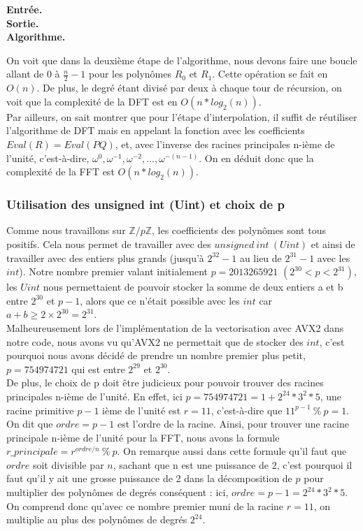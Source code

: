 \documentclass[12pt, a4paper]{article}
\begin{document}
\begin{tcolorbox}[colback=cyan!5!white,
                  colframe=cyan!100!black,
                  title=\textbf{Algorithme DFT (METTRE SOURCES)}
                 ]
\textbf{Entrée.} \\
\textbf{Sortie.} \\
\textbf{Algorithme.}
\end{tcolorbox}

On voit que dans la deuxième étape de l'algorithme, nous devons faire une boucle allant de 0 à $\frac{n}{2}-1$ pour les polynômes $R_0$ et $R_1$. Cette opération se fait en $O(n)$. De plus, le degré étant divisé par deux à chaque tour de récursion, on voit que la complexité de la DFT est en $O(n*log_2(n))$. \\
Par ailleurs, on sait montrer que pour l'étape d'interpolation, il suffit de réutiliser l'algorithme de DFT mais en appelant la fonction avec les coefficients $Eval(R)=Eval(PQ)$, et, avec l'inverse des racines principales n-ième de l'unité, c'est-à-dire, $\omega^{0},\omega^{-1},\omega^{-2},\dots,\omega^{-(n-1)}$.
On en déduit donc que la complexité de la FFT est $O(n*log_2(n))$.

\subsubsection{Utilisation des unsigned int (Uint) et choix de p}

Comme nous travaillons sur $\mathbb{Z}/p\mathbb{Z}$, les coefficients des polynômes sont tous positifs. Cela nous permet de travailler avec des $unsigned\ int\ (Uint)$ et ainsi de travailler avec des entiers plus grands (jusqu’à $2^{32}-1$ au lieu de $2^{31}-1$ avec les $int$). Notre nombre premier valant initialement $p=2013265921$ $(2^{30} < p < 2^{31})$, les $Uint$ nous permettaient de pouvoir stocker la somme de deux entiers a et b entre $2^{30}$ et $p-1$, alors que ce n'était possible avec les $int$ car $a+b\geq2\times2^{30}=2^{31}$. \\
Malheureusement lors de l'implémentation de la vectorisation avec AVX2 dans notre code, nous avons vu qu'AVX2 ne permettait que de stocker des $int$, c'est pourquoi nous avons décidé de prendre un nombre premier plus petit, $p=754974721$ qui est entre $2^{29}$ et  $2^{30}$. \\
De plus, le choix de p doit être judicieux pour pouvoir trouver des racines principales n-ième de l'unité. En effet, ici $p = 754974721 = 1+2^{24}*3^2*5$, une racine primitive $p-1$ ième de l'unité est $r = 11$, c'est-à-dire que $11^{p-1}\ \%\ p = 1$. On dit que $ordre = p-1$ est l'ordre de la racine. Ainsi, pour trouver une racine principale n-ième de l'unité pour la FFT, nous avons la formule $r\_principale = r^{ordre/n}\ \% \ p$. On remarque aussi dans cette formule qu'il faut que $ordre$ soit divisible par $n$, sachant que n est une puissance de 2, c'est pourquoi il faut qu'il y ait une grosse puissance de 2 dans la décomposition de $p$ pour multiplier des polynômes de degrés conséquent : ici, $ordre = p-1 = 2^{24}*3^2*5$. On comprend donc qu'avec ce nombre premier muni de la racine $r = 11$, on multiplie au plus des polynômes de degrés $2^{24}$.
\end{document}
